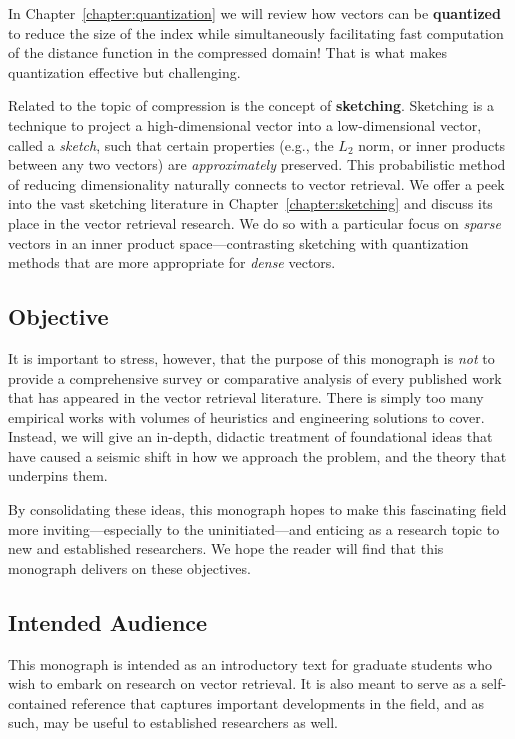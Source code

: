 In Chapter~\ref{chapter:quantization} we will review how vectors
can be \textbf{quantized} to reduce the size of the index
while simultaneously facilitating fast computation of the distance function
in the compressed domain! That is what makes quantization effective but challenging.

Related to the topic of compression is the concept of \textbf{sketching}.
Sketching is a technique to project a high-dimensional vector into
a low-dimensional vector, called a \emph{sketch}, such that certain properties
(e.g., the $L_2$ norm, or inner products between any two vectors) are \emph{approximately}
preserved. This probabilistic method of reducing dimensionality naturally
connects to vector retrieval.
We offer a peek into the vast sketching literature in Chapter~\ref{chapter:sketching}
and discuss its place in the vector retrieval research.
We do so with a particular focus on \emph{sparse} vectors in an inner product
space---contrasting sketching with quantization methods that are more appropriate
for \emph{dense} vectors.

\subsection*{Objective}

It is important to stress, however, that the purpose of this monograph is \emph{not}
to provide a comprehensive survey or comparative analysis of every published work
that has appeared in the vector retrieval literature.
There is simply too many empirical works with volumes of heuristics and engineering
solutions to cover. Instead, we will give an in-depth, didactic treatment of foundational
ideas that have caused a seismic shift in how we approach the problem,
and the theory that underpins them.

By consolidating these ideas, this monograph hopes to make this fascinating field
more inviting---especially to the uninitiated---and enticing as a research topic
to new and established researchers. We hope the reader will find that this
monograph delivers on these objectives.

\subsection*{Intended Audience}

This monograph is intended as an introductory text
for graduate students who wish to embark on research on vector retrieval.
It is also meant to serve as a self-contained reference that captures
important developments in the field, and as such, may be useful to established
researchers as well.

